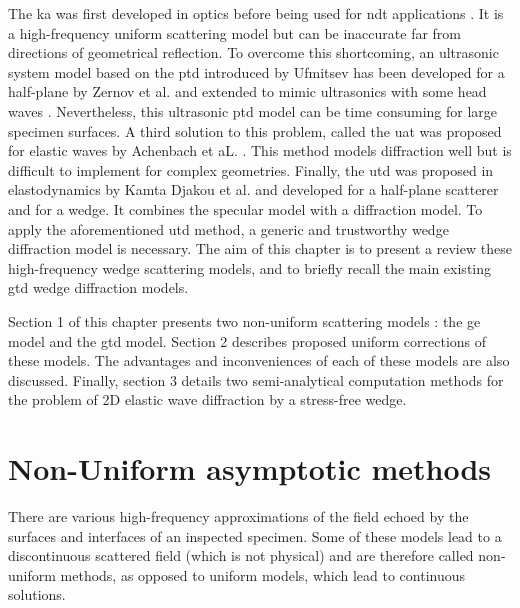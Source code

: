 The \acrfull{ka} was first developed in optics \cite{POoptics} before being used for \acrshort{ndt} applications \cite{Schmerr,Dorval}. It is a high-frequency uniform scattering model but can be inaccurate far from directions of geometrical reflection. To overcome this shortcoming, an ultrasonic system model based on the \acrfull{ptd} introduced by Ufmitsev \cite{Ufmi} has been developed for a half-plane by Zernov et al. \cite{Zernov} and extended to mimic ultrasonics with some head waves \cite{systmodel,FradkinDarmon}. Nevertheless, this ultrasonic \acrshort{ptd} model can be time consuming for large specimen surfaces. A third solution to this problem, called the \acrfull{uat} was proposed for elastic waves by Achenbach et aL. \cite{Achenbach}. This method models diffraction well but is difficult to implement for complex geometries. Finally, the \acrfull{utd} was proposed in elastodynamics by Kamta Djakou et al. \cite{Audrey, AKDthese} and developed for a half-plane scatterer and for a wedge. It combines the specular model with a diffraction model. To apply the aforementioned \acrshort{utd} method, a generic and trustworthy wedge diffraction model is necessary. The aim of this chapter is to present a review these high-frequency wedge scattering models, and to briefly recall the main existing \acrshort{gtd} wedge diffraction models.

Section 1 of this chapter presents two non-uniform scattering models : the \acrshort{ge} model and the \acrshort{gtd} model. Section 2 describes proposed uniform corrections of these models. The advantages and inconveniences of each of these models are also discussed. Finally, section 3 details two semi-analytical computation methods for the problem of 2D elastic wave diffraction by a stress-free wedge.

\section{Non-Uniform asymptotic methods}

There are various high-frequency approximations of the field echoed by the surfaces and interfaces of an inspected specimen. Some of these models lead to a discontinuous scattered field (which is not physical) and are therefore called non-uniform methods, as opposed to uniform models, which lead to continuous solutions.

